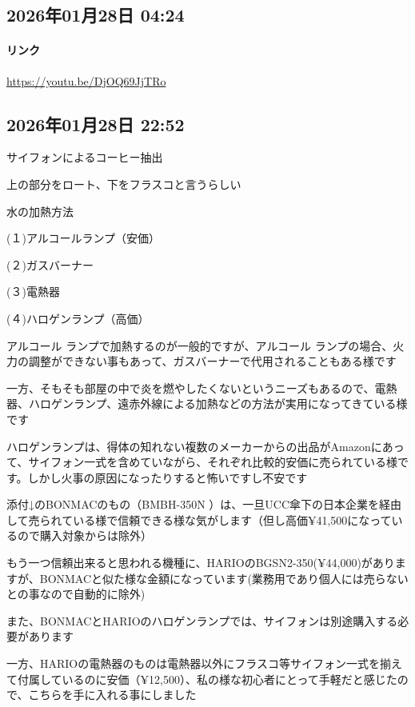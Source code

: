 \subsection*{2026年01月28日 04:24}

\paragraph{リンク}
\url{https://youtu.be/DjOQ69JjTRo}

\subsection*{2026年01月28日 22:52}

サイフォンによるコーヒー抽出

上の部分をロート、下をフラスコと言うらしい

水の加熱方法

(１)アルコールランプ（安価）

(２)ガスバーナー

(３)電熱器

(４)ハロゲンランプ（高価）

アルコール ランプで加熱するのが一般的ですが、アルコール ランプの場合、火力の調整ができない事もあって、ガスバーナーで代用されることもある様です

一方、そもそも部屋の中で炎を燃やしたくないというニーズもあるので、電熱器、ハロゲンランプ、遠赤外線による加熱などの方法が実用になってきている様です

ハロゲンランプは、得体の知れない複数のメーカーからの出品がAmazonにあって、サイフォン一式を含めていながら、それぞれ比較的安価に売られている様です。しかし火事の原因になったりすると怖いですし不安です

添付↓のBONMACのもの（BMBH-350N ）は、一旦UCC傘下の日本企業を経由して売られている様で信頼できる様な気がします（但し高価¥41,500になっているので購入対象からは除外）

もう一つ信頼出来ると思われる機種に、HARIOのBGSN2-350(¥44,000)がありますが、BONMACと似た様な金額になっています(業務用であり個人には売らないとの事なので自動的に除外)

また、BONMACとHARIOのハロゲンランプでは、サイフォンは別途購入する必要があります

一方、HARIOの電熱器のものは電熱器以外にフラスコ等サイフォン一式を揃えて付属しているのに安価（¥12,500）、私の様な初心者にとって手軽だと感じたので、こちらを手に入れる事にしました

